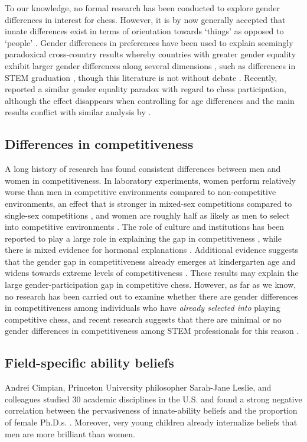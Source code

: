 \documentclass[9pt,twocolumn,twoside,lineno]{pnas-new}
\begin{document}
To our knowledge, no formal research has been conducted to explore gender differences in interest for chess. However, it is by now generally accepted that innate differences exist in terms of orientation towards `things' as opposed to `people' \cite{beltz2011,lippa2010}. Gender differences in preferences have been used to explain seemingly paradoxical cross-country results whereby countries with greater gender equality exhibit larger gender differences along several dimensions \cite{Falk2018,schmitt2017}, such as differences in STEM graduation \cite{Stoet2018}, though this literature is not without debate \cite{Richardson2020}. Recently, \citep{vishkin2022} reported a similar gender equality paradox with regard to chess participation, although the effect disappears when controlling for age differences and the main results conflict with similar analysis by \citep{dilmaghani2021}. 

\subsection*{Differences in competitiveness}
A long history of research has found consistent differences between men and women in competitiveness. In laboratory experiments, women perform relatively worse than men in competitive environments compared to non-competitive environments, an effect that is stronger in mixed-sex competitions compared to single-sex competitions \cite{gneezy2003}, and women are roughly half as likely as men to select into competitive environments \cite{niederle2007}. The role of culture and institutions has been reported to play a large role in explaining the gap in competitiveness \cite{booth2018,zhang2018,andersen2013}, while there is mixed evidence for hormonal explanations \cite{apicella2011,wozniak2014,sapienza2009gender}. Additional evidence suggests that the gender gap in competitiveness already emerges at kindergarten age \cite{sutter2015} and widens towards extreme levels of competitiveness \cite{saccardo2018}. These results may explain the large gender-participation gap in competitive chess. However, as far as we know, no research has been carried out to examine whether there are gender differences in competitiveness among individuals who have \textit{already selected into} playing competitive chess, and recent research suggests that there are minimal or no gender differences in competitiveness among STEM professionals for this reason \cite{Boudreau2022}. 



\subsection*{Field-specific ability beliefs}
Andrei Cimpian, Princeton University philosopher Sarah-Jane Leslie, and colleagues studied 30 academic disciplines in the U.S. and found a strong negative correlation between the pervasiveness of innate-ability beliefs and the proportion of female Ph.D.s. \cite{leslie2015expectations}. Moreover, very young children already internalize beliefs that men are more brilliant than women. 
\end{document}
